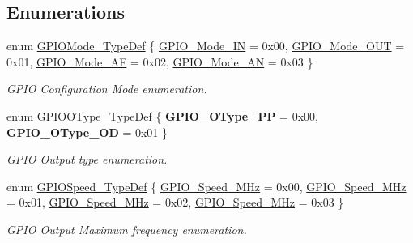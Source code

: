 \subsection*{Enumerations}
\begin{DoxyCompactItemize}
\item 
enum \hyperlink{group___g_p_i_o_ga1347339e1c84a196fabbb31205eec5d4}{G\+P\+I\+O\+Mode\+\_\+\+Type\+Def} \{ \hyperlink{group___g_p_i_o_gga1347339e1c84a196fabbb31205eec5d4a484aa18a6156ce916049b334ba1839de}{G\+P\+I\+O\+\_\+\+Mode\+\_\+\+IN} = 0x00, 
\hyperlink{group___g_p_i_o_gga1347339e1c84a196fabbb31205eec5d4a60f1d530f4119efcad8e1a68c890c6a6}{G\+P\+I\+O\+\_\+\+Mode\+\_\+\+O\+UT} = 0x01, 
\hyperlink{group___g_p_i_o_gga1347339e1c84a196fabbb31205eec5d4a6d44c35c6c5008d85bac9251a867e701}{G\+P\+I\+O\+\_\+\+Mode\+\_\+\+AF} = 0x02, 
\hyperlink{group___g_p_i_o_gga1347339e1c84a196fabbb31205eec5d4a6e5c0d7e6d2e22b834b24e1ca1d6d0db}{G\+P\+I\+O\+\_\+\+Mode\+\_\+\+AN} = 0x03
 \}\begin{DoxyCompactList}\small\item\em G\+P\+IO Configuration Mode enumeration. \end{DoxyCompactList}
\item 
\mbox{\label{group___g_p_i_o_gae74212e8d66c389f47326b06bdf6d2ab}} 
enum \hyperlink{group___g_p_i_o_gae74212e8d66c389f47326b06bdf6d2ab}{G\+P\+I\+O\+O\+Type\+\_\+\+Type\+Def} \{ {\bfseries G\+P\+I\+O\+\_\+\+O\+Type\+\_\+\+PP} = 0x00, 
{\bfseries G\+P\+I\+O\+\_\+\+O\+Type\+\_\+\+OD} = 0x01
 \}\begin{DoxyCompactList}\small\item\em G\+P\+IO Output type enumeration. \end{DoxyCompactList}
\item 
enum \hyperlink{group___g_p_i_o_ga062ad92b67b4a1f301c161022cf3ba8e}{G\+P\+I\+O\+Speed\+\_\+\+Type\+Def} \{ \hyperlink{group___g_p_i_o_gga062ad92b67b4a1f301c161022cf3ba8ea9bff9e174639332007c914483361be18}{G\+P\+I\+O\+\_\+\+Speed\+\_\+M\+Hz} = 0x00, 
\hyperlink{group___g_p_i_o_gga062ad92b67b4a1f301c161022cf3ba8ea59a0acdf2ccd1b4b8d507e845e497c62}{G\+P\+I\+O\+\_\+\+Speed\+\_\+M\+Hz} = 0x01, 
\hyperlink{group___g_p_i_o_gga062ad92b67b4a1f301c161022cf3ba8ea9c47db10456202ac05134b12738ce581}{G\+P\+I\+O\+\_\+\+Speed\+\_\+M\+Hz} = 0x02, 
\hyperlink{group___g_p_i_o_gga062ad92b67b4a1f301c161022cf3ba8ea195a0e73cd63d7f5b5d41bd0155eacbb}{G\+P\+I\+O\+\_\+\+Speed\+\_\+M\+Hz} = 0x03
 \}\begin{DoxyCompactList}\small\item\em G\+P\+IO Output Maximum frequency enumeration. \end{DoxyCompactList}

\end{DoxyCompactItemize}
